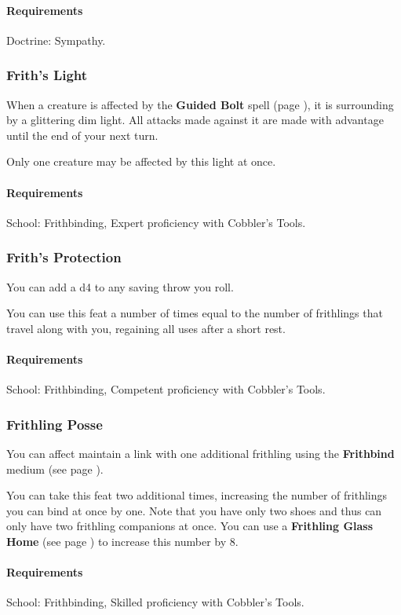    \paragraph{Requirements} Doctrine: Sympathy.
\subsubsection{Frith's Light} \label{feat::frithslight}
    When a creature is affected by the \textbf{Guided Bolt} spell (page \pageref{spell::guidedbolt}), it is surrounding by a glittering dim light.
    All attacks made against it are made with advantage until the end of your next turn.

    Only one creature may be affected by this light at once.
    \paragraph{Requirements} School: Frithbinding, Expert proficiency with Cobbler's Tools.
\subsubsection{Frith's Protection} \label{feat::frithsprotection}
    You can add a d4 to any saving throw you roll.

    You can use this feat a number of times equal to the number of frithlings that travel along with you, regaining all uses after a short rest.
    \paragraph{Requirements} School: Frithbinding, Competent proficiency with Cobbler's Tools.
\subsubsection{Frithling Posse} \label{feat::frithlingposse}
    You can affect maintain a link with one additional frithling using the \textbf{Frithbind} medium (see page \pageref{medium::frithbind}).

    You can take this feat two additional times, increasing the number of frithlings you can bind at once by one.
    Note that you have only two shoes and thus can only have two frithling companions at once.
    You can use a \textbf{Frithling Glass Home} (see page \pageref{item::frithlingglasshome}) to increase this number by 8.
    \paragraph{Requirements} School: Frithbinding, Skilled proficiency with Cobbler's Tools.

